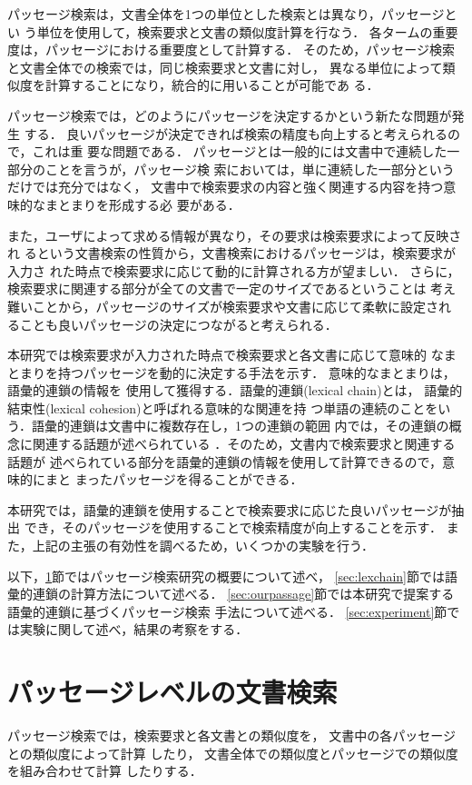 パッセージ検索は，文書全体を1つの単位とした検索とは異なり，パッセージとい
う単位を使用して，検索要求と文書の類似度計算を行なう．
各タームの重要度は，パッセージにおける重要度として計算する．
そのため，パッセージ検索と文書全体での検索では，同じ検索要求と文書に対し，
異なる単位によって類似度を計算することになり，統合的に用いることが可能であ
る．

パッセージ検索では，どのようにパッセージを決定するかという新たな問題が発生
する．
良いパッセージが決定できれば検索の精度も向上すると考えられるので，これは重
要な問題である．
パッセージとは一般的には文書中で連続した一部分のことを言うが，パッセージ検
索においては，単に連続した一部分というだけでは充分ではなく，
文書中で検索要求の内容と強く関連する内容を持つ意味的なまとまりを形成する必
要がある．

また，ユーザによって求める情報が異なり，その要求は検索要求によって反映され
るという文書検索の性質から，文書検索におけるパッセージは，検索要求が入力さ
れた時点で検索要求に応じて動的に計算される方が望ましい．
さらに，検索要求に関連する部分が全ての文書で一定のサイズであるということは
考え難いことから，パッセージのサイズが検索要求や文書に応じて柔軟に設定され
ることも良いパッセージの決定につながると考えられる．

本研究では検索要求が入力された時点で検索要求と各文書に応じて意味的
なまとまりを持つパッセージを動的に決定する手法を示す．
意味的なまとまりは，
語彙的連鎖\cite{Morris:91}の情報を
使用して獲得する．語彙的連鎖(lexical chain)とは，
語彙的結束性(lexical cohesion)\cite{Halliday:76}と呼ばれる意味的な関連を持
つ単語の連続のことをいう．語彙的連鎖は文書中に複数存在し，1つの連鎖の範囲
内では，その連鎖の概念に関連する話題が述べられている
\cite{okumura:94a,Barzilay:97}．そのため，文書内で検索要求と関連する話題が
述べられている部分を語彙的連鎖の情報を使用して計算できるので，意味的にまと
まったパッセージを得ることができる．

本研究では，語彙的連鎖を使用することで検索要求に応じた良いパッセージが抽出
でき，そのパッセージを使用することで検索精度が向上することを示す．
また，上記の主張の有効性を調べるため，いくつかの実験を行う．

以下，\ref{sec:passage}節ではパッセージ検索研究の概要について述べ，
\ref{sec:lexchain}節では語彙的連鎖の計算方法について述べる．
\ref{sec:ourpassage}節では本研究で提案する語彙的連鎖に基づくパッセージ検索
手法について述べる．
\ref{sec:experiment}節では実験に関して述べ，結果の考察をする．

\section{パッセージレベルの文書検索}\label{sec:passage}
パッセージ検索では，検索要求と各文書との類似度を，
文書中の各パッセージとの類似度によって計算
\cite{Mittendorf:94,Hearst:93,Melucci:98}したり，
文書全体での類似度とパッセージでの類似度を組み合わせて計算
\cite{Callan:94,Salton:93,Wilkinson:94,Allan:95}したりする．


